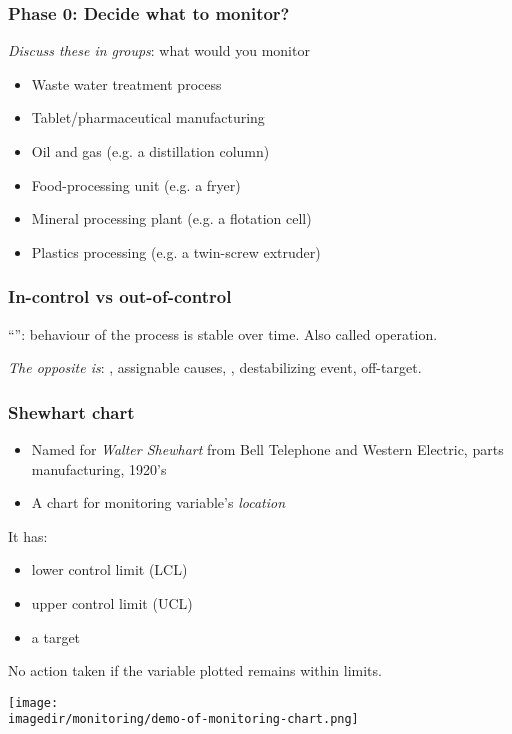 \begin{frame}\frametitle{Phase 0: Decide what to monitor?}

	\emph{Discuss these in groups}: what would you monitor
	\begin{itemize}
		\item	Waste water treatment process
		\item	Tablet/pharmaceutical manufacturing
		\item	Oil and gas (e.g. a distillation column)
		\item	Food-processing unit (e.g. a fryer)
		\item	Mineral processing plant (e.g. a flotation cell)
		\item	Plastics processing (e.g. a twin-screw extruder)
	\end{itemize}
\end{frame}

\begin{frame}\frametitle{In-control vs out-of-control}
	\begin{exampleblock}{}
		\begin{center}
			``{\color{purple}{In-control}}'': behaviour of the process is stable over time. Also called {} operation.
		\end{center}
	\end{exampleblock}
	\vspace{24pt}
	\emph{The opposite is}: {\color{purple}{out of control}}, assignable causes, {\color{purple}{special causes}}, destabilizing event, off-target.
\end{frame}

\begin{frame}\frametitle{Shewhart chart}
	\begin{itemize}
		\item	Named for \emph{Walter Shewhart} from Bell Telephone and Western Electric, parts manufacturing, 1920's
		\item	A chart for monitoring variable's \emph{location}
	\end{itemize}

	\vspace{12pt}

	It has:
	\begin{itemize}
		\item	lower control limit (LCL)
		\item	upper control limit (UCL)
		\item	a target
	\end{itemize}

	\vspace{12pt}
	No action taken if the variable plotted remains within limits.
	\\
	{}
	\begin{center}
		\texttt{[image: \\imagedir/monitoring/demo-of-monitoring-chart.png]}
	\end{center}
\end{frame}

